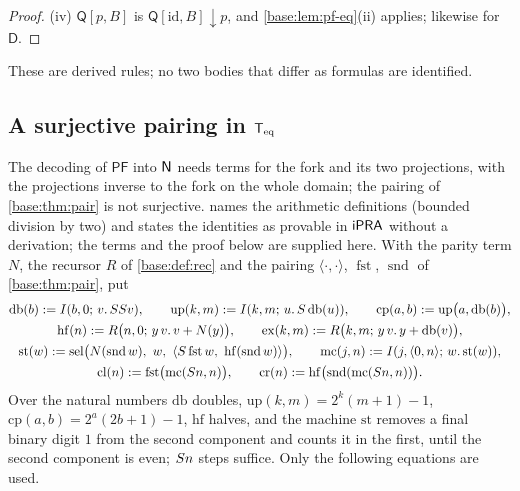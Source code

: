\begin{proof}
(iv) $\mathsf Q[p,B]$ is $\mathsf Q[\mathrm{id},B]{\downarrow}p$, and
\cref{base:lem:pf-eq}(ii) applies; likewise for $\mathsf D$.
\end{proof}

These are derived rules; no two bodies that differ as formulas are
identified.

\subsection{A surjective pairing in \texorpdfstring{$\mathsf{T}_{\mathrm{eq}}$}{Teq}}
\label{base:sec:cp}

The decoding of $\mathsf{PF}$ into $\mathsf{N}$ needs terms for the fork and its
two projections, with the projections inverse to the fork on the whole
domain; the pairing of \cref{base:thm:pair} is not surjective.
 names the arithmetic definitions (bounded division by
two) and states the identities as provable in $\mathsf{iPRA}$ without a
derivation; the terms and the proof below are supplied here.
With the parity term $N$, the recursor $R$ of \cref{base:def:rec} and the
pairing $\langle\cdot,\cdot\rangle$, $\operatorname{fst}$,
$\operatorname{snd}$ of \cref{base:thm:pair}, put
\begin{gather*}
 \mathrm{db}(b)\defeq\It{b}{0}{v}{\Suc\Suc v},\qquad
 \mathrm{up}(k,m)\defeq\It{k}{m}{u}{\Suc\,\mathrm{db}(u)},\qquad
 \mathrm{cp}(a,b)\defeq\mathrm{up}\bigl(a,\mathrm{db}(b)\bigr),\\
 \mathrm{hf}(n)\defeq R\bigl(n,0;\,y\,v.\,v+N(y)\bigr),\qquad
 \mathrm{ex}(k,m)\defeq R\bigl(k,m;\,y\,v.\,y+\mathrm{db}(v)\bigr),\\
 \mathrm{st}(w)\defeq\sel\bigl(N(\operatorname{snd}w),\ w,\
   \langle\Suc\operatorname{fst}w,\ \mathrm{hf}(\operatorname{snd}w)\rangle\bigr),
 \qquad
 \mathrm{mc}(j,n)\defeq\It{j}{\langle 0,n\rangle}{w}{\mathrm{st}(w)},\\
 \mathrm{cl}(n)\defeq\operatorname{fst}\bigl(\mathrm{mc}(\Suc n,n)\bigr),\qquad
 \mathrm{cr}(n)\defeq\mathrm{hf}\bigl(\operatorname{snd}(\mathrm{mc}(\Suc n,n))\bigr).
\end{gather*}
Over the natural numbers $\mathrm{db}$ doubles,
$\mathrm{up}(k,m)=2^{k}(m+1)-1$, $\mathrm{cp}(a,b)=2^{a}(2b+1)-1$,
$\mathrm{hf}$ halves, and the machine $\mathrm{st}$ removes a final binary
digit $1$ from the second component and counts it in the first, until the
second component is even; $S n$ steps suffice.  Only the following
equations are used.

